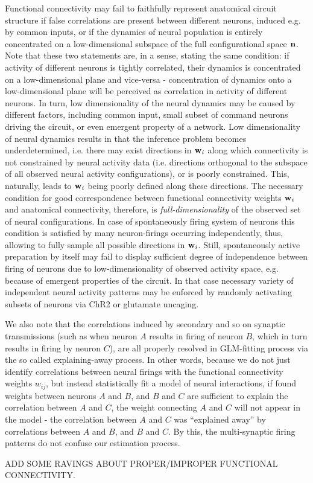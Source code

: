 Functional connectivity may fail to faithfully represent anatomical circuit structure if false correlations are present between different neurons, induced e.g. by common inputs, or if the dynamics of neural population is entirely concentrated on a low-dimensional subspace of the full configurational space ${\bf n}$. Note that these two statements are, in a sense, stating the same condition: if activity of different neurons is tightly correlated, their dynamics is concentrated on a low-dimensional plane and vice-versa - concentration of dynamics onto a low-dimensional plane will be perceived as correlation in activity of different neurons. In turn, low dimensionality of the neural dynamics may be caused by different factors, including common input, small subset of command neurons driving the circuit, or even emergent property of a network. Low dimensionality of neural dynamics results in that the inference problem becomes underdetermined, i.e. there may exist directions in ${\bf w}_i$ along which connectivity is not constrained by neural activity data (i.e. directions orthogonal to the subspace of all observed neural activity configurations), or is poorly constrained. This, naturally, leads to ${\bf w}_i$ being poorly defined along these directions. The necessary condition for good correspondence between functional connectivity weights ${\bf w}_i$ and anatomical connectivity, therefore, is {\em full-dimensionality} of the observed set of neural configurations. In case of spontaneously firing system of neurons this condition is satisfied by many neuron-firings occurring independently, thus, allowing to fully sample all possible directions in ${\bf w}_i$.  Still, spontaneously active preparation by itself may fail to display sufficient degree of independence between firing of neurons due to low-dimensionality of observed activity space, e.g. because of emergent properties of the circuit. In that case necessary variety of independent neural activity patterns may be enforced by randomly activating subsets of neurons via ChR2 or glutamate uncaging.

We also note that the correlations induced by secondary and so on synaptic transmissions (such as when neuron $A$ results in firing of neuron $B$, which in turn results in firing by neuron $C$), are all properly resolved in GLM-fitting process via the so called explaining-away process. In other words, because we do not just identify correlations between neural firings with the functional connectivity weights $w_{ij}$, but instead statistically fit a model of neural interactions, if found weights between neurons $A$ and $B$, and $B$ and $C$ are sufficient to explain the correlation between $A$ and $C$, the weight connecting $A$ and $C$ will not appear in the model - the correlation between $A$ and $C$ was ``explained away'' by correlations between $A$ and $B$, and $B$ and $C$. By this, the multi-synaptic firing patterns do not confuse our estimation process.

ADD SOME RAVINGS ABOUT PROPER/IMPROPER FUNCTIONAL CONNECTIVITY.
